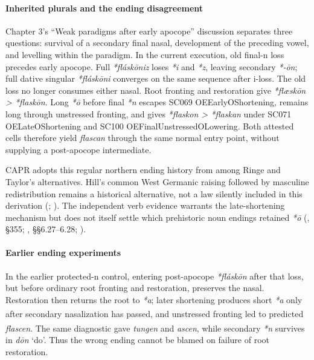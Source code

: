 \documentclass[
  british,
  a4paper,
]{article}
\providecommand{\Pred}[1]{\textsuperscript{\dag}\emph{#1}}
\begin{document}
\paragraph{Inherited plurals and the ending
disagreement}\label{inherited-plurals-and-the-ending-disagreement}

Chapter 3's ``Weak paradigms after early apocope'' discussion separates
three questions: survival of a secondary final nasal, development of the
preceding vowel, and levelling within the paradigm. In the current
execution, old final-n loss precedes early apocope. Full
\emph{*fláskōniz} loses \emph{*i} and \emph{*z}, leaving secondary
\emph{*-ōn}; full dative singular \emph{*fláskōni} converges on the same
sequence after i-loss. The old loss no longer consumes either nasal.
Root fronting and restoration give \emph{*flæskōn > *flaskōn}. Long
\emph{*ō} before final \emph{*n} escapes SC069 OEEarlyOShortening,
remains long through unstressed fronting, and gives
\emph{*flaskon > *flaskan} under SC071 OELateOShortening and SC100
OEFinalUnstressedOLowering. Both attested cells therefore yield
\emph{flascan} through the same normal entry point, without supplying a
post-apocope intermediate.

CAPR adopts this regular northern ending history from among Ringe and
Taylor's alternatives. Hill's common West Germanic raising followed by
masculine redistribution remains a historical alternative, not a law
silently included in this derivation
(;
). The independent verb
evidence warrants the late-shortening mechanism but does not itself
settle which prehistoric noun endings retained \emph{*ō}
(, §355;
, §§6.27--6.28;
).

\paragraph{Earlier ending experiments}\label{earlier-ending-experiments}

In the earlier protected-n control, entering post-apocope
\emph{*fláskōn} after that loss, but before ordinary root fronting and
restoration, preserves the nasal. Restoration then returns the root to
\emph{*a}; later shortening produces short \emph{*a} only after
secondary nasalization has passed, and unstressed fronting led to
predicted \Pred{flascen}. The same diagnostic gave \Pred{tungen} and
\Pred{ascen}, while secondary \emph{*n} survives in \emph{dōn} `do'.
Thus the wrong ending cannot be blamed on failure of root restoration.
\end{document}
